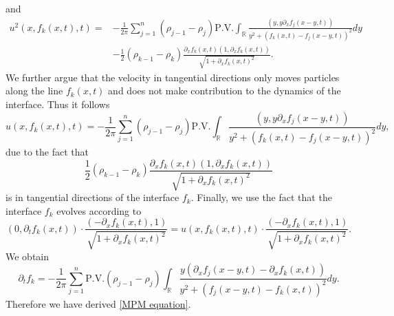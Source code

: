\documentclass[11pt]{article}
\newcommand{\PV}{\mathrm{P.V.}}
\theoremstyle{definition}
\numberwithin{equation}{section}
\begin{document}
     and
     \begin{align}
         u^2(x,f_k(x,t),t)=&-\frac{1}{2\pi}\sum_{j=1}^n(\rho_{j-1}-\rho_j)\PV\int_{\mathbb{R}}\frac{(y,y\partial_{x}f_j(x-y,t))}{y^2+(f_k(x,t)-f_j(x-y,t))^2}dy\\
         &-\frac{1}{2}(\rho_{k-1}-\rho_k)\frac{\partial_xf_k(x,t)(1,\partial_xf_k(x,t))}{\sqrt{1+\partial_xf_k(x,t)^2}}.
     \end{align}We further argue that the velocity in tangential directions only moves particles along the line $f_k(x,t)$ and does not make contribution to the dynamics of the interface. Thus it follows
\begin{equation}
    u\left(x,f_k(x,t),t\right)=-\frac{1}{2\pi}\sum_{j=1}^n(\rho_{j-1}-\rho_j)\PV\int_{\mathbb{R}}\frac{\left(y,y\partial_{x}f_j(x-y,t)\right)}{y^2+\left(f_k(x,t)-f_j(x-y,t)\right)^2}dy,
\end{equation}
due to the fact that
\begin{equation}
    \frac{1}{2}(\rho_{k-1}-\rho_k)\frac{\partial_xf_k(x,t)(1,\partial_xf_k(x,t))}{\sqrt{1+\partial_xf_k(x,t)^2}}
\end{equation}
is in tangential directions of the interface $f_k$. Finally, we use the fact that the interface \(f_k\) evolves according to
\begin{equation}\label{dynamic for string}   \left(0,\partial_tf_k(x,t)\right)\cdot\frac{\left(-\partial_xf_k(x,t),1\right)}{\sqrt{1+\partial_xf_k(x,t)^2}}=u\left(x,f_k(x,t),t\right)\cdot\frac{\left(-\partial_xf_k(x,t),1\right)}{\sqrt{1+\partial_xf_k(x,t)^2}}.
\end{equation}
We obtain
\begin{equation}
    \partial_tf_k=-\frac{1}{2\pi}\sum_{j=1}^n\PV(\rho_{j-1}-\rho_j) \int_{\mathbb{R}}\frac{y\left(\partial_xf_j(x-y,t)-\partial_xf_k(x,t)\right)}{y^2+(f_j(x-y,t)-f_k(x,t))^2}dy.
\end{equation}
Therefore we have derived \eqref{MPM equation}.
\end{document}
